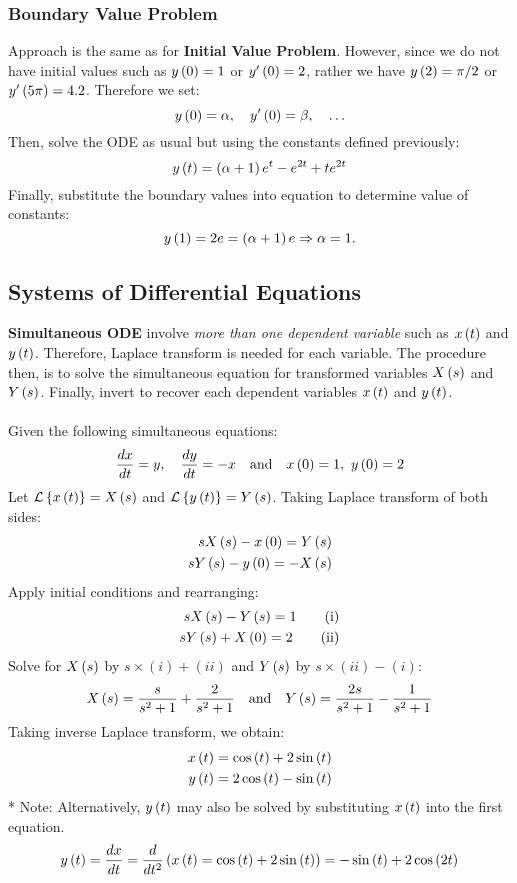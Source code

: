 \subsubsection{Boundary Value Problem}
Approach is the same as for \textbf{Initial Value Problem}. However, since we do not have initial values such as $y\left(0\right)=1$ or $y'\left(0\right)=2$, rather we have $y\left(2\right)=\pi/2$ or $y'\left(5\pi\right)=4.2$. Therefore we set:
\begin{equation}
    y\left(0\right)=\alpha,\quad y'\left(0\right)=\beta,\quad\ldots
\end{equation}
Then, solve the ODE as usual but using the constants defined previously:
\begin{equation}
    y\left(t\right)=\left(\alpha+1\right)e^{t}-e^{2t}+te^{2t}
\end{equation}
Finally, substitute the boundary values into equation to determine value of constants:
\begin{equation}
    y\left(1\right)=2e=\left(\alpha+1\right)e\Rightarrow\alpha=1.
\end{equation}
\subsection{Systems of Differential Equations}
\textbf{Simultaneous ODE} involve \textit{more than one dependent variable} such as $x\left(t\right)$ and $y\left(t\right)$. Therefore, Laplace transform is needed for each variable. The procedure then, is to solve the simultaneous equation for transformed variables $X\left(s\right)$ and $Y\left(s\right)$. Finally, invert to recover each dependent variables $x\left(t\right)$ and $y\left(t\right)$.\\\\
Given the following simultaneous equations:
\begin{equation*}
    \dif{x}{t}=y,\quad\dif{y}{t}=-x\quad\text{and}\quad\x{0}=1,\ \y{0}=2
\end{equation*}
Let $\mathcal{L}\left\{x\left(t\right)\right\}=X\left(s\right)$ and $\mathcal{L}\left\{y\left(t\right)\right\}=Y\left(s\right)$. Taking Laplace transform of both sides:
\begin{align}
    sX\left(s\right)-x\left(0\right)=Y\left(s\right)\nonumber\\
    sY\left(s\right)-y\left(0\right)=-X\left(s\right)
\end{align}
Apply initial conditions and rearranging:
\begin{align}
    sX\left(s\right)-Y\left(s\right)=1\tag{i}\\
    sY\left(s\right)+X\left(0\right)=2\tag{ii}
\end{align}
Solve for $X\left(s\right)$ by $s\times(i)+(ii)$ and $Y\left(s\right)$ by $s\times(ii)-(i)$:
\begin{equation*}
    X\left(s\right)=\frac{s}{s^2+1}+\frac{2}{s^2+1}\quad\text{and}\quad Y\left(s\right)=\frac{2s}{s^2+1}-\frac{1}{s^2+1}
\end{equation*}
Taking inverse Laplace transform, we obtain:
\begin{align*}
    x\left(t\right)&=\cos\left(t\right)+2\sin\left(t\right)\\
    y\left(t\right)&=2\cos\left(t\right)-\sin\left(t\right)
\end{align*}
* Note: Alternatively, $y\left(t\right)$ may also be solved by substituting $x\left(t\right)$ into the first equation.
\begin{equation}
    y\left(t\right)=\frac{d{x}}{d{t}}=\frac{d}{dt^2}\left(x\left(t\right)=\cos\left(t\right)+2\sin\left(t\right)\right)=-\sin\left(t\right)+2\cos\left(2t\right)
\end{equation}
\newpage